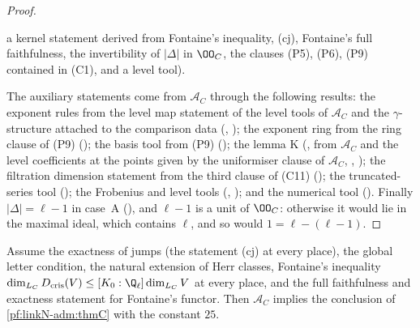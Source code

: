 \begin{proof}
\begin{itemize}
  a kernel statement  derived from Fontaine's inequality, (cj),
  Fontaine's full faithfulness, the invertibility of $|\Delta|$ in $\OO_C$, the clauses (P5), (P6), (P9) contained in (C1),
  and a level tool).
\end{itemize}
The auxiliary statements come from $\mathcal A_C$ through the following results: the exponent rules from the level map
statement of the level tools of $\mathcal A_C$ and the $\gamma$-structure attached to the comparison data
(, );
the exponent ring from the ring clause of (P9) (); the basis
tool from (P9) (); the lemma K
(, from $\mathcal A_C$ and the level coefficients at the points
given by the uniformiser clause of $\mathcal A_C$, ,
); the filtration dimension statement from the third clause of (C11)
(); the truncated-series tool
(); the Frobenius and level tools
(,
); and the numerical tool
(). Finally $|\Delta|=\ell-1$ in case~A
(), and $\ell-1$ is a unit of $\OO_C$: otherwise it would lie in
the maximal ideal, which contains $\ell$, and so would $1=\ell-(\ell-1)$.
\end{proof}

\begin{proposition}\label{pf:linkN-adm:thmCred}
Assume the exactness of jumps (the statement (cj) at every place), the global letter condition, the natural extension of
Herr classes, Fontaine's inequality $\dim_{L_C}D_{\mathrm{cris}}(V)\le[K_0:\Q_\ell]\dim_{L_C}V$ at every place, and the full
faithfulness and exactness statement for Fontaine's functor. Then $\mathcal A_C$ implies the conclusion of
\cref{pf:linkN-adm:thmC} with the constant $25$.
\end{proposition}


